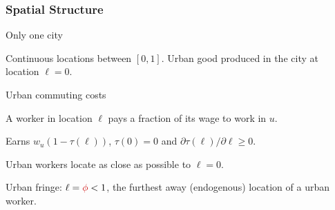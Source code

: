 \documentclass[aspectratio=169]{beamer}
\begin{document}




\begin{v75mins}
\begin{frame}
\frametitle{Spatial Structure}
\begin{midi}
\item Only one city 
\item Continuous locations \re{$\ell$} between $[0,1]$. Urban good produced in the city at location $\ell=0$.

\item Urban commuting costs
 \bi \item A worker in location $\ell$ pays a fraction \re{$\tau(\ell)$} of its wage to work in $u$.
 \item Earns $w_u(1-\tau(\ell))$, $\tau(0)=0$ and $\partial \tau(\ell)/\partial \ell \geq 0$. \ei
\item Urban workers locate as close as possible to $\ell=0$.
\item Urban fringe: $\ell=\re{\phi}<1$, the furthest away (endogenous) location of a urban worker.
\end{midi}

\end{frame}\end{v75mins}
\end{document}
